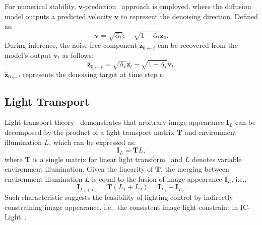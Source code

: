 For numerical stability, $\mathbf{v}$-prediction~\cite{salimans2022progressive} approach is employed, 
where the diffusion model outputs a predicted velocity $\mathbf{v}$ to represent the denoising direction.
Defined as:
\begin{equation}\label{eq: v_pred}
    \mathbf{v}=\sqrt{\bar{\alpha}_t} \epsilon-\sqrt{1-\bar{\alpha}_t} \mathbf{z}_0.
\end{equation}
During inference, the noise-free component $\hat{\mathbf{z}}_{0 \gets t}$ can be recovered from the model's output $\mathbf{v}_t$ as follows:
\begin{equation}\label{eq: z0_pred}
    \hat{\mathbf{z}}_{0 \gets t}=\sqrt{\bar{\alpha}_t} \mathbf{z}_t-\sqrt{1-\bar{\alpha}_t} \mathbf{v}_t.
\end{equation}
$ \hat{\mathbf{z}}_{0 \gets t}$ represents the denoising target at time step $t$.


\subsection{ Light Transport}
\label{sec:lightTrans}
Light transport theory~\cite{debevec2000acquiring,zhang2025scaling} demonstrates that arbitrary image appearance
$\mathbf{I}_L$ can be decomposed by the product of a light transport matrix $\mathbf{T}$  and environment illumination $L$, which can be expressed as:
\begin{equation}\label{eq:decomposition}
    \mathbf{I}_L = \mathbf{T}L,
\end{equation}
where $\mathbf{T}$ is a single matrix for linear light transform~\cite{debevec2000acquiring} and 
$L$ denotes variable environment illumination.
Given the linearity of $\mathbf{T}$, the merging between environment illumination $L$ 
is equal to the fusion of image appearance $\mathbf{I}_L$, i.e., 
\begin{equation}\label{eq:light_fusion}
    \mathbf{I}_{L_1 + L_2} =  \mathbf{T}(L_1 +L_2) = \mathbf{I}_{L_1} + \mathbf{I}_{L_2}.
\end{equation}
Such characteristic suggests the feasibility of lighting control by indirectly constraining image appearance, 
i.e., the consistent image light constraint in IC-Light~\citep{zhang2025scaling}. 


\label{sec:iclight}